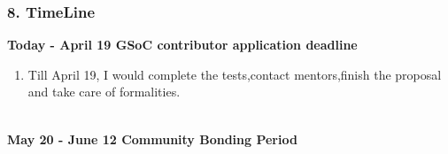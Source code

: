 \documentclass[12pt]{article}
\begin{document}
 \subsubsection{8. TimeLine}
 
{\large\bfseries {\color{orange}Today - April 19}  GSoC contributor application deadline}\\

\begin{enumerate}[label = {  \color{MediumBlue} \textbf{\arabic*. }},align=left]
\item Till April 19, I would complete the tests,contact mentors,finish the  proposal and take care of  formalities.
\end{enumerate}
\\
{\large\bfseries {\color{orange}May 20 - June 12}  Community Bonding Period }
\end{document}
